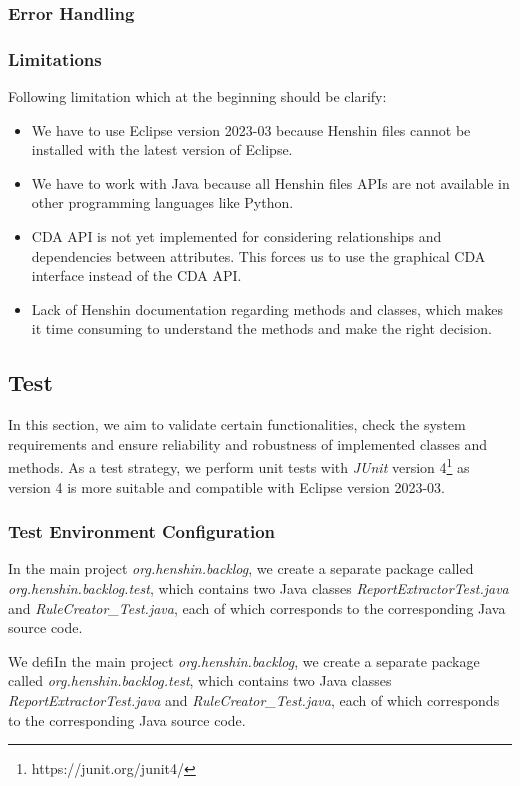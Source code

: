 \subsubsection*{Error Handling}

\subsubsection*{Limitations}
Following limitation which at the beginning should be clarify:
\begin{itemize}
	\item We have to use Eclipse version 2023-03 because Henshin files cannot be installed with the latest version of Eclipse.
	\item We have to work with Java because all Henshin files APIs are not available in other programming languages like Python.
	\item CDA API is not yet implemented for considering relationships and dependencies between attributes. This forces us to use the graphical CDA interface instead of the CDA API.
	\item Lack of Henshin documentation regarding methods and classes, which makes it time consuming to understand the methods and make the right decision.
\end{itemize}


\subsection{Test}\label{redundancy_test}
In this section, we aim to validate certain functionalities, check the system requirements and ensure reliability and robustness of implemented classes and methods. As a test strategy, we perform unit tests with \textit{JUnit} version 4\footnote{https://junit.org/junit4/} as version 4 is more suitable and compatible with Eclipse version 2023-03.

\subsubsection*{Test Environment Configuration}
In the main project \textit{org.henshin.backlog}, we create a separate package called \textit{org.henshin.backlog.test}, which contains two Java classes \textit{ReportExtractorTest.java} and \textit{RuleCreator\_Test.java}, each of which corresponds to the corresponding Java source code.

We defiIn the main project \textit{org.henshin.backlog}, we create a separate package called \textit{org.henshin.backlog.test}, which contains two Java classes \textit{ReportExtractorTest.java} and \textit{RuleCreator\_Test.java}, each of which corresponds to the corresponding Java source code.

